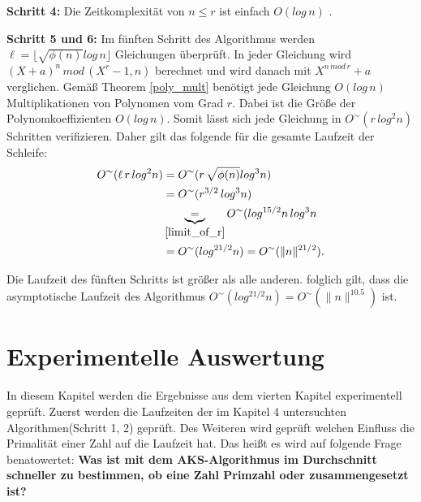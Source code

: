 \documentclass[12pt,oneside]{article}
\theoremstyle{remark}
\theoremstyle{definition}
\begin{document}
\textbf{Schritt 4:}\newline
Die Zeitkomplexität von $n \leq r$ ist einfach $O(log \, n)$ \cite{computer-algebra}.

\textbf{Schritt 5 und 6:}\newline
Im fünften Schritt des Algorithmus werden $\ell = \lfloor \sqrt{\phi(n)} log \, n \rfloor$ Gleichungen überprüft. In jeder Gleichung wird $(X + a)^n \, mod \, (X^r - 1,n)$ berechnet und wird danach mit $X^{n \, mod \, r} + a$ verglichen. Gemäß Theorem \ref{poly_mult} benötigt jede Gleichung $O(log \, n)$ Multiplikationen von Polynomen vom Grad $r$. Dabei ist die Größe der Polynomkoeffizienten $O(log \, n)$. Somit lässt sich jede Gleichung in $O^{\sim}(r \, log^2n)$ Schritten verifizieren. Daher gilt das folgende für die gesamte Laufzeit der Schleife:\newline
\begin{align*}
    O^{\sim}(\ell \, r \, log^2n) &= O^{\sim}(r \, \sqrt{\phi(n)} log^3 n)  \\
    &= O^{\sim}(r^{3/2} \, log^3 n) \\
    &\underbrace{=}_{\ref{limit_of_r}} O^{\sim}(log^{15/2}n \, log^3n \\ 
    &=O^{\sim}(log^{21/2}n) = O^{\sim}( \lVert n \rVert^{21/2}).
\end{align*}

Die Laufzeit des fünften Schritts ist größer als alle anderen. folglich gilt, dass die asymptotische Laufzeit des Algorithmus $O^{\sim}(log^{21/2}n) = O^{\sim}(\lVert n \rVert^{10.5})$ ist.\newline


\newpage

\section{Experimentelle Auswertung}
In diesem Kapitel werden die Ergebnisse aus dem vierten Kapitel experimentell geprüft. Zuerst werden die Laufzeiten der im Kapitel 4 untersuchten Algorithmen(Schritt 1, 2) geprüft. Des Weiteren wird geprüft welchen Einfluss die Primalität einer Zahl auf die Laufzeit hat. Das heißt es wird auf folgende Frage benatowertet:\newline
\textbf{Was ist mit dem AKS-Algorithmus im Durchschnitt schneller zu bestimmen, ob eine Zahl Primzahl oder zusammengesetzt ist?}
\end{document}
